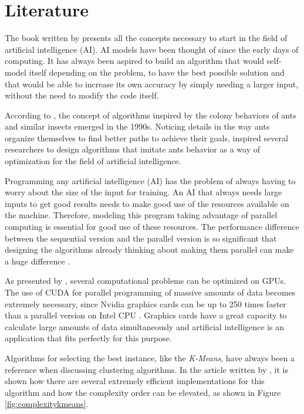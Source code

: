 \section{Literature}

The book written by \cite{BookIA} presents all the concepts necessary to start in the field of artificial intelligence (AI).
AI models have been thought of since the early days of computing. It has always been aspired to build an algorithm
that would self-model itself depending on the problem, to have the best possible solution
and that would be able to increase its own accuracy by simply needing a larger input, without the need to modify
the code itself.

According to \cite{AntColonyOptimization}, the concept of algorithms
inspired by the colony behaviors of ants and similar insects emerged in the 1990s.
Noticing details in the way ants organize themselves to find better
paths to achieve their goals, inspired several researchers to design algorithms that imitate ants behavior as a way
of optimization for the field of artificial intelligence.

Programming any artificial intelligence (AI) has the problem of always having to worry about the size of the input for training.
An AI that always needs large inputs to get good results needs to make good use of the resources available on the machine.
Therefore, modeling this program taking advantage of parallel computing is essential for good use of these resources.
The performance difference between the sequential version and the parallel version is so significant that designing the algorithms
already thinking about making them parallel can make a huge difference \cite{SequentialVSParallel}.

As presented by \cite{ParallelComputingCUDA}, several computational problems can be optimized on GPUs.
The use of CUDA for parallel programming of massive amounts of data becomes extremely necessary, since
Nvidia graphics cards can be up to 250 times faster than a parallel version on Intel CPU \cite{ParallelComputingCUDA}.
Graphics cards have a great capacity to calculate large amounts of data simultaneously and artificial intelligence
is an application that fits perfectly for this purpose.

Algorithms for selecting the best instance, like the \emph{K-Means}, have always been a reference when discussing clustering algorithms. In the article written by \cite{KmeansAlgorithm},
it is shown how there are several extremely efficient implementations for this algorithm and how the complexity order can be elevated, as shown in Figure \ref{fig:complexitykmeans}.

